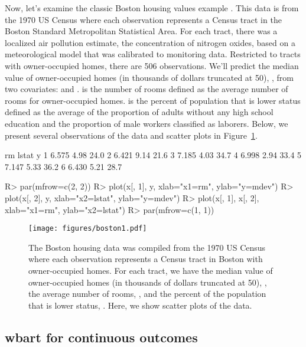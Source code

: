 \documentclass[article]{jss}
\begin{document}
Now, let's examine the classic Boston housing values example
\citep{HarrRubi78}.  This data is from the 1970 US Census where each
observation represents a Census tract in the Boston Standard
Metropolitan Statistical Area.  For each tract, there was a localized
air pollution estimate, the concentration of nitrogen oxides, based on
a meteorological model that was calibrated to monitoring data.
Restricted to tracts with owner-occupied homes, there are 506
observations.  We'll predict the median value of owner-occupied homes
(in thousands of dollars truncated at 50), , from two
covariates:  and .   is the number of
rooms defined as the average number of rooms for owner-occupied homes.
 is the percent of population that is lower status defined
as the average of the proportion of adults without any high school
education and the proportion of male workers classified as laborers.
Below, we present several observations of the data and scatter plots
in Figure~\ref{boston1}.
\begin{Soutput}
     rm lstat    y
1 6.575  4.98 24.0
2 6.421  9.14 21.6
3 7.185  4.03 34.7
4 6.998  2.94 33.4
5 7.147  5.33 36.2
6 6.430  5.21 28.7
\end{Soutput}
\begin{Sinput}
R> par(mfrow=c(2, 2))
R> plot(x[, 1], y, xlab="x1=rm", ylab="y=mdev")
R> plot(x[, 2], y, xlab="x2=lstat", ylab="y=mdev")
R> plot(x[, 1], x[, 2], xlab="x1=rm", ylab="x2=lstat")
R> par(mfrow=c(1, 1))
\end{Sinput}
\begin{figure}
\begin{center}
\texttt{[image: figures/boston1.pdf]}
\end{center}
\caption{\label{boston1}The Boston housing data was compiled from the
  1970 US Census where each observation represents a Census tract in
  Boston with owner-occupied homes. For each tract, we have the median
  value of owner-occupied homes (in thousands of dollars truncated at
  50), , the average number of rooms, , and
  the percent of the population that is lower status, .
  Here, we show scatter plots of the data.  }
\end{figure}

\subsection{wbart for continuous outcomes}
\end{document}
